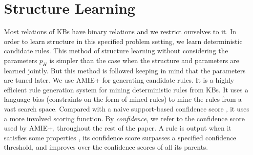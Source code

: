 \documentclass[akbc,twoside,11pt]{article}
\newcommand{\ondrej}[1]{\textcolor{red}{O: {#1}}}
\newcommand{\arcchit}[1]{\textcolor{red}{A: {#1}}}
\newcommand{\algorithmname}{SafeLearner\xspace}
\begin{document}
\section{Structure Learning}
\label{sec:structure_learning}
Most relations of KBs have binary relations and we restrict ourselves to it. In order to learn structure in this specified problem setting, we learn deterministic candidate rules. %
This method of structure learning without considering the parameters $p_H$ is simpler than the case when the structure and parameters are learned jointly. But this method is followed keeping in mind that the parameters are tuned later. 
We use AMIE+ for generating candidate rules. It is a highly efficient rule generation system for mining deterministic rules from KBs. It uses a language bias (constraints on the form of mined rules) to mine the rules from a vast search space. Compared with a naive support-based confidence score \cite{DBLP:conf/sigmod/AgrawalIS93}, it uses a more involved scoring function. %
By \textit{confidence}, we refer to the confidence score used by AMIE+, throughout the rest of the paper. A rule is output when it satisfies some properties \citep{DBLP:journals/vldb/GalarragaTHS15}, its confidence score surpasses a specified confidence threshold, and improves over the confidence scores of all its parents.

\end{document}
